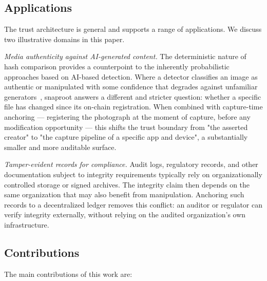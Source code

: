 \documentclass[11pt,a4paper]{article}
\begin{document}
\subsection{Applications}

The trust architecture is general and supports a range of applications.
We discuss two illustrative domains in this paper.

\emph{Media authenticity against AI-generated content.} The deterministic
nature of hash comparison provides a counterpoint to the inherently
probabilistic approaches based on AI-based detection. Where a detector
classifies an image as authentic or manipulated with some confidence
that degrades against unfamiliar generators~\cite{rossler2019faceforensics,
li2018ictuoculi}, snaproot answers a different and stricter question:
whether a specific file has changed since its on-chain registration. When
combined with capture-time anchoring --- registering the photograph at
the moment of capture, before any modification opportunity --- this
shifts the trust boundary from "the asserted creator" to "the capture
pipeline of a specific app and device", a substantially smaller and more
auditable surface.

\emph{Tamper-evident records for compliance.} Audit logs, regulatory
records, and other documentation subject to integrity requirements
typically rely on organizationally controlled storage or signed archives.
The integrity claim then depends on the same organization that may also
benefit from manipulation. Anchoring such records to a decentralized
ledger removes this conflict: an auditor or regulator can verify
integrity externally, without relying on the audited organization's own
infrastructure.

\subsection{Contributions}

The main contributions of this work are:
\end{document}
